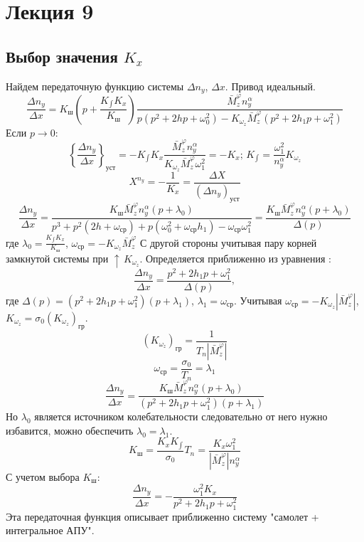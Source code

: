 \documentclass{article}
\begin{document}
\section{Лекция 9}
\subsection{Выбор значения \texorpdfstring{$K_x$}{Lg}}
Найдем передаточную функцию системы $\Delta n_y$, $\Delta x$. Привод идеальный.
\begin{equation}
    \frac{\Delta n_y}{\Delta x} = K_\text{ш} (p + \frac{K_{\int}
    K_x}{K_\text{ш}}) \frac{\bar{M}_z^{\varphi} n_y^\alpha}{p(p^2 +  2 h p +
    \omega_0^2) - K_{\omega_z} \bar{M}_z^{\varphi} (p^2 + 2h_{1}p +
\omega_1^2)}
\end{equation}
Если $p \rightarrow 0$:
\[
    \left\{ \frac{\Delta n_y}{\Delta x} \right\}_\text{уст}  = -K_{\int}K_x
    \frac{\bar{M}_z^{\varphi} n_y^\alpha}{K_{\omega_z} \bar{M}_z^{\varphi}
    \omega_1^2} = -K_x; \, K_{\int} = \frac{\omega_1^2}{n_y^\alpha}
    K_{\omega_z}
\]
\[
    X^{n_y} = - \frac{1}{K_x} = \frac{\Delta X}{(\Delta n_y)_\text{уст}}
\]
\[
    \frac{\Delta n_y}{\Delta x} = \frac{K_\text{ш} \bar{M}_z^\varphi
    n_y^\alpha(p + \lambda_0)}{p^3 + p^2 (2h+\omega_\text{ср}) + p (\omega_0^2
    + \omega_\text{ср} h_1) - \omega_\text{ср} \omega_1^2} = \frac{K_\text{ш}
\bar{M}_z^\varphi n_y^\alpha(p + \lambda_0)}{\Delta(p)}
\]
где $\lambda_0 = \frac{K_{\int} K_x}{K_\text{ш}}$, $\omega_\text{ср} =
-K_{\omega_z}\bar{M}_z^\varphi$
С другой стороны учитывая пару корней замкнутой системы при $\uparrow \,
K_{\omega_z}$. Определяется приближенно из уравнения :
\[
    \frac{\Delta n_y}{\Delta x} = \frac{p^2 + 2 h_1 p + \omega_1^2}{\Delta(p)},
\]
где $\Delta(p) = (p^2 + 2 h_1 p + \omega_1^2)(p + \lambda_1)$, $\lambda_1 =
\omega_\text{ср}$. Учитывая $\omega_\text{ср} = - K_{\omega_z}
|\bar{M}_z^\varphi|$, $K_{\omega_z} = \sigma_0 (K_{\omega_z})_\text{гр}$.
\[
    (K_{\omega_z})_\text{гр} = \frac{1}{T_n |\bar{M}_z^\varphi|}
\]
\[
    \omega_\text{ср} = \frac{\sigma_0}{T_n} = \lambda_1
\]
\[
    \frac{\Delta n_y}{\Delta x} = \frac{K_\text{ш} \bar{M}_z^\varphi
    n_y^\alpha(p + \lambda_0)}{(p^2 + 2h_{1} p + \omega_1^2)(p+\lambda_1)}
\]
Но $\lambda_0$ является источником колебательности следовательно от него нужно
избавится, можно обеспечить $\lambda_0 = \lambda_1$.
\[
    K_\text{ш} = \frac{K_{x} K_{\int}}{\sigma_0} T_n = \frac{K_x
    \omega_1^2}{|\bar{M}_z^\varphi| n_y^\alpha}
\]
С учетом выбора $K_\text{ш}$:
\begin{equation}
    \frac{\Delta n_y}{\Delta x} = -\frac{\omega_1^2 K_x}{p^2 + 2 h_1 p +
    \omega_1 ^2}
\end{equation}
Эта передаточная функция описывает приближенно систему "самолет + интегральное
АПУ".
\end{document}

